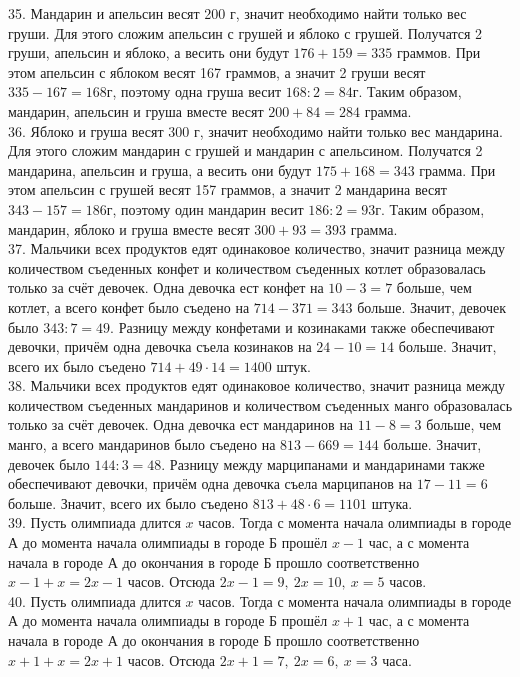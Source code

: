 35. Мандарин и апельсин весят 200 г, значит необходимо найти только вес груши. Для этого сложим апельсин с грушей и яблоко с грушей. Получатся 2 груши, апельсин и яблоко, а весить они будут $176+159=335$ граммов. При этом апельсин с яблоком весят 167 граммов, а значит 2 груши весят $335-167=168$г, поэтому одна груша весит $168:2=84$г. Таким образом, мандарин, апельсин и груша вместе весят $200+84=284$ грамма.\\
36. Яблоко и груша весят 300 г, значит необходимо найти только вес мандарина. Для этого сложим мандарин с грушей и мандарин с апельсином. Получатся 2 мандарина, апельсин и груша, а весить они будут $175+168=343$ грамма. При этом апельсин с грушей весят 157 граммов, а значит 2 мандарина весят $343-157=186$г, поэтому один мандарин весит $186:2=93$г. Таким образом, мандарин, яблоко и груша вместе весят $300+93=393$ грамма.\\
37. Мальчики всех продуктов едят одинаковое количество, значит разница между количеством съеденных конфет и количеством съеденных котлет образовалась только за счёт девочек. Одна девочка ест конфет на $10-3=7$ больше, чем котлет, а всего конфет было съедено на $714-371=343$ больше. Значит, девочек было $343:7=49.$ Разницу между конфетами и козинаками также обеспечивают девочки, причём одна девочка съела козинаков на $24-10=14$ больше. Значит, всего их было съедено $714+49\cdot14=1400$ штук.\\
38. Мальчики всех продуктов едят одинаковое количество, значит разница между количеством съеденных мандаринов и количеством съеденных манго образовалась только за счёт девочек. Одна девочка ест мандаринов на $11-8=3$ больше, чем манго, а всего мандаринов было съедено на $813-669=144$ больше. Значит, девочек было $144:3=48.$ Разницу между марципанами и мандаринами также обеспечивают девочки, причём одна девочка съела марципанов на $17-11=6$ больше. Значит, всего их было съедено $813+48\cdot6=1101$ штука.\\
39. Пусть олимпиада длится $x$ часов. Тогда с момента начала олимпиады в городе А до момента начала олимпиады в городе Б прошёл $x-1$ час, а с момента начала в городе А до окончания в городе Б прошло соответственно $x-1+x=2x-1$ часов. Отсюда $2x-1=9,\ 2x=10,\ x=5$ часов.\\
40. Пусть олимпиада длится $x$ часов. Тогда с момента начала олимпиады в городе А до момента начала олимпиады в городе Б прошёл $x+1$ час, а с момента начала в городе А до окончания в городе Б прошло соответственно $x+1+x=2x+1$ часов. Отсюда $2x+1=7,\ 2x=6,\ x=3$ часа.\\
